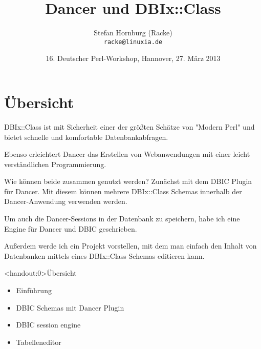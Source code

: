 \usepackage[utf8]{inputenc}
\usepackage[T1]{fontenc}
\usepackage{mathptmx}
\usepackage[scaled=.90]{helvet}
\usepackage{courier}
\usepackage{caption}
\captionsetup{labelformat=empty,labelsep=none}
\usepackage{verbatim}
\usepackage{hyperref}
\usepackage{listings}
\lstset{language=Perl,basicstyle=\normalsize,tabsize=3,showstringspaces=false}

\title{Dancer und DBIx::Class}
\author[racke]{Stefan Hornburg (Racke)\\ \texttt{racke@linuxia.de}}
\date{16. Deutscher Perl-Workshop, Hannover, 27. März 2013}


\maketitle{}

\begin{frame}
  \titlepage
\end{frame}

\tableofcontents

\section{Übersicht}

DBIx::Class ist mit Sicherheit einer der größten Schätze von "Modern Perl"
und bietet schnelle und komfortable Datenbankabfragen.

Ebenso erleichtert Dancer das Erstellen von Webanwendungen mit einer leicht
verständlichen Programmierung.

Wie können beide zusammen genutzt werden? Zunächst mit dem DBIC Plugin für
Dancer. Mit diesem können mehrere DBIx::Class Schemas innerhalb der
Dancer-Anwendung verwenden werden.

Um auch die Dancer-Sessions in der Datenbank zu speichern, habe ich eine Engine für Dancer und DBIC geschrieben.

Außerdem werde ich ein Projekt vorstellen, mit dem man einfach den Inhalt
von Datenbanken mittels eines DBIx::Class Schemas editieren kann.

\begin{frame}<handout:0>{Übersicht}
\begin{itemize}
\item Einführung
\item DBIC Schemas mit Dancer Plugin
\item DBIC session engine
\item Tabelleneditor
\end{itemize}
\end{frame}

